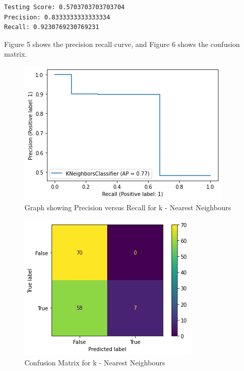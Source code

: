 \documentclass[conference]{IEEEtran}
\begin{document}
\begin{enumerate}
\begin{verbatim}
Testing Score: 0.5703703703703704
Precision: 0.8333333333333334
Recall: 0.9230769230769231
\end{verbatim}
Figure 5 shows the precision recall curve, and Figure 6 shows the confusion matrix. 
\begin{figure}[htbp]
\centerline{\includegraphics[width = \linewidth]{kNN}}
\label{fig5}
\caption{Graph showing Precision versus Recall for k - Nearest Neighbours}
\end{figure}
\begin{figure}[htbp]
\centerline{\includegraphics[width = \linewidth]{CM_kNN}}
\label{fig6}
\caption{Confusion Matrix for k - Nearest Neighbours}
\end{figure}

\end{enumerate}
\end{document}
